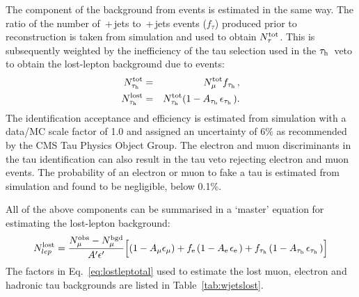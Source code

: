 The component of the \wpj background from \tauh events is estimated in the same way. 
The ratio of the number of \wmunubr\,+\,jets to \wtauhnubr\,+\,jets events ($f_{\tau}$) produced prior to reconstruction is taken from simulation and used to obtain $N^{\rm tot}_{\tau}$. This is subsequently weighted by the inefficiency of the tau selection used in the $\tau_\mathrm{h}\,$ veto to obtain the lost-lepton background due to \tauh events:
\begin{eqnarray}
N^{\rm tot}_{\tau_\mathrm{h}\,}  &=& N^{\rm tot}_{\mu}f_{\tau_\mathrm{h}\,},\\
N^{\rm lost}_{\tau_\mathrm{h}\,} &=& N^{\rm tot}_{\tau_\mathrm{h}\,}(1 - A_{\tau_\mathrm{h}\,}\epsilon_{\tau_\mathrm{h}\,}).
\end{eqnarray}
The \tauh identification acceptance and efficiency is estimated from simulation with a data/MC scale factor of 1.0 and assigned an uncertainty of 6$\%$ as recommended by the \ac{CMS} Tau Physics Object Group. 
The electron and muon discriminants in the tau identification can also result in the tau veto rejecting electron and muon events. 
The probability of an electron or muon to fake a tau is estimated from \wpj{} simulation and found to be negligible, below 0.1\%.

All of the above components can be summarised in a `master' equation for estimating the lost-lepton background:
\begin{equation}
N^{\rm lost}_{lep} = \frac{N^{\rm obs}_{\mu} - N^{\rm bgd}_{\mu}}{A'\epsilon'}\Big[(1 - A_{\mu}\epsilon_{\mu}) + f_{\mathrm{e}\,}(1 - A_{\mathrm{e}\,}\epsilon_{\mathrm{e}\,}) + f_{\tau_\mathrm{h}\,}(1 - A_{\tau_\mathrm{h}\,}\epsilon_{\tau_\mathrm{h}\,})\Big]
\label{eq:lostleptotal}
\end{equation}
The factors in Eq.~\ref{eq:lostleptotal} used to estimate the lost muon, electron and hadronic tau backgrounds are listed in Table~\ref{tab:wjetslost}. 



